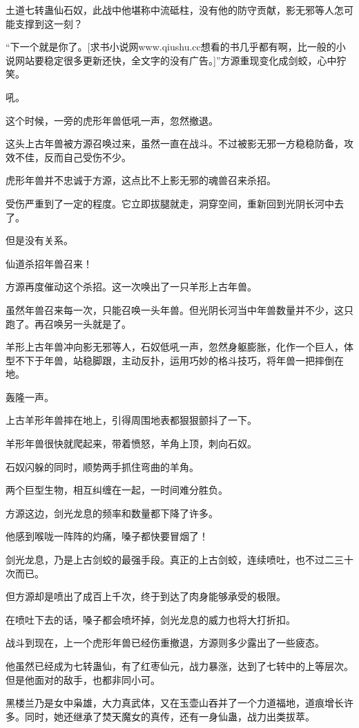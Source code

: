\begin{this_body}
土道七转蛊仙石奴，此战中他堪称中流砥柱，没有他的防守贡献，影无邪等人怎可能支撑到这一刻？

“下一个就是你了。[求书小说网www.qiushu.cc想看的书几乎都有啊，比一般的小说网站要稳定很多更新还快，全文字的没有广告。]”方源重现变化成剑蛟，心中狞笑。

吼。

这个时候，一旁的虎形年兽低吼一声，忽然撤退。

这头上古年兽被方源召唤过来，虽然一直在战斗。不过被影无邪一方稳稳防备，攻效不佳，反而自己受伤不少。

虎形年兽并不忠诚于方源，这点比不上影无邪的魂兽召来杀招。

受伤严重到了一定的程度。它立即拔腿就走，洞穿空间，重新回到光阴长河中去了。

但是没有关系。

仙道杀招年兽召来！

方源再度催动这个杀招。这一次唤出了一只羊形上古年兽。

虽然年兽召来每一次，只能召唤一头年兽。但光阴长河当中年兽数量并不少，这只跑了。再召唤另一头就是了。

羊形上古年兽冲向影无邪等人，石奴低吼一声，忽然身躯膨胀，化作一个巨人，体型不下于年兽，站稳脚跟，主动反扑，运用巧妙的格斗技巧，将年兽一把摔倒在地。

轰隆一声。

上古羊形年兽摔在地上，引得周围地表都狠狠颤抖了一下。

羊形年兽很快就爬起来，带着愤怒，羊角上顶，刺向石奴。

石奴闪躲的同时，顺势两手抓住弯曲的羊角。

两个巨型生物，相互纠缠在一起，一时间难分胜负。

方源这边，剑光龙息的频率和数量都下降了许多。

他感到喉咙一阵阵的灼痛，嗓子都快要冒烟了！

剑光龙息，乃是上古剑蛟的最强手段。真正的上古剑蛟，连续喷吐，也不过二三十次而已。

但方源却是喷出了成百上千次，终于到达了肉身能够承受的极限。

在喷吐下去的话，嗓子都会喷坏掉，剑光龙息的威力也将大打折扣。

战斗到现在，上一个虎形年兽已经伤重撤退，方源则多少露出了一些疲态。

他虽然已经成为七转蛊仙，有了红枣仙元，战力暴涨，达到了七转中的上等层次。但是他面对的敌手，也都非同小可。

黑楼兰乃是女中枭雄，大力真武体，又在玉壶山吞并了一个力道福地，道痕增长许多。同时，她还继承了焚天魔女的真传，还有一身仙蛊，战力出类拔萃。


\end{this_body}
